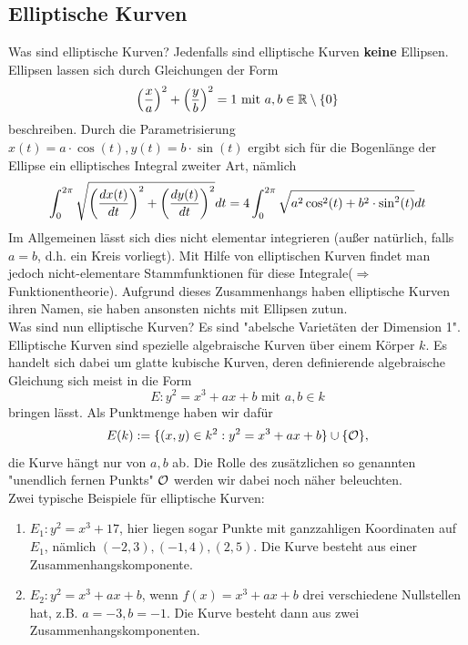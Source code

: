 \subsection*{Elliptische Kurven}
Was sind elliptische Kurven? Jedenfalls sind elliptische Kurven \textbf{keine} Ellipsen. 
Ellipsen lassen sich durch Gleichungen der Form
\[ \enbrace*{\frac{x}{a}}^2 + \enbrace*{\frac{y}{b}}^2 = 1 \text{ mit } a,b \in \RR \setminus \setnull \]
beschreiben. 
Durch die Parametrisierung $x(t) = a \cdot \cos(t), y(t) = b \cdot \sin(t)$ ergibt sich für die Bogenlänge der Ellipse ein elliptisches Integral zweiter Art, nämlich
\[ \int_{0}^{2\pi} \sqrt{ \enbrace*{\frac{dx(t)}{dt}}^2 + \enbrace*{\frac{dy(t)}{dt}}^2 } dt = 4 \int_{0}^{2\pi} \sqrt{ a^2 \cos^2(t) + b^2 \cdot \sin^2 (t)} dt \]
Im Allgemeinen lässt sich dies nicht elementar integrieren (außer natürlich, falls $a = b$, d.h. ein Kreis vorliegt). 
Mit Hilfe von elliptischen Kurven findet man jedoch nicht-elementare Stammfunktionen für diese Integrale\linebreak ($\Rightarrow$ Funktionentheorie). 
Aufgrund dieses Zusammenhangs haben elliptische Kurven ihren Namen, sie haben ansonsten nichts mit Ellipsen zutun. \\

Was sind nun elliptische Kurven? Es sind "abelsche Varietäten der Dimension 1". 
Elliptische Kurven sind spezielle algebraische Kurven über einem Körper $k$. 
Es handelt sich dabei um glatte kubische Kurven, deren definierende algebraische Gleichung sich meist in die Form
\[ E \colon y^2 = x^3 + ax + b \text{ mit } a,b \in k \]
bringen lässt. 
Als Punktmenge haben wir dafür
\[ E(k) := \{ (x,y) \in k^2 : y^2 = x^3 + ax + b\} \cup \{ \oh \}, \]
die Kurve hängt nur von $a,b$ ab. 
Die Rolle des zusätzlichen so genannten "unendlich fernen Punkts" $\oh$ werden wir dabei noch näher beleuchten. \\

Zwei typische Beispiele für elliptische Kurven:
\begin{enumerate}[1)]
	\item $E_1\colon y^2 = x^3 + 17$, hier liegen sogar Punkte mit ganzzahligen Koordinaten auf $E_1$, nämlich $(-2,3), (-1,4), (2,5)$. 
	Die Kurve besteht aus einer Zusammenhangskomponente.
	\item $E_2 \colon y^2 = x^3 + ax + b$, wenn $f(x) = x^3 + ax + b$ drei verschiedene Nullstellen hat, z.B. $a = -3, b= -1$. 
	Die Kurve besteht dann aus zwei Zusammenhangskomponenten.
\end{enumerate}

